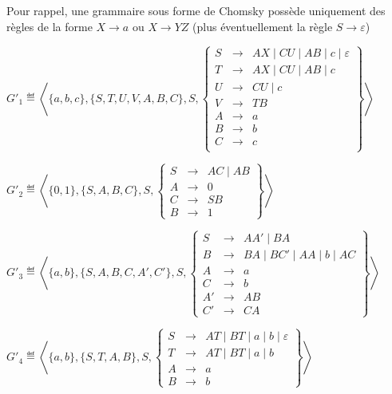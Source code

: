 \begin{corrections}
  
  Pour rappel, une grammaire sous forme de Chomsky possède uniquement des règles de la
  forme $X\rightarrow a$ ou $X\rightarrow YZ$
  (plus éventuellement la règle $S\rightarrow\varepsilon$)
  \begin{questions}
  \item $G'_1 \eqdef \left\langle\{a, b, c\}, \{S,T, U, V, A,B,C\}, S,
    \left\{\begin{array}{lll}
    S   &\rightarrow& AX \mid CU \mid  AB \mid c \mid \varepsilon \\
    T   &\rightarrow& AX \mid CU \mid  AB \mid c \\
    U   &\rightarrow& CU \mid  c \\
    V   &\rightarrow& TB \\
    A   &\rightarrow& a \\
    B   &\rightarrow& b \\
    C   &\rightarrow& c \\
    \end{array}\right\}\right\rangle$
  \item $G'_2 \eqdef \left\langle\{0, 1\}, \{S,A,B,C\}, S,
    \left\{\begin{array}{lll}
    S   &\rightarrow& AC \mid  AB \\
    A   &\rightarrow& 0 \\
    C   &\rightarrow& SB \\
    B   &\rightarrow& 1
    \end{array}\right\}\right\rangle$
  \item $G'_3 \eqdef \left\langle\{a, b\}, \{S, A, B, C, A', C'\}, S,
    \left\{\begin{array}{lll}
    S   &\rightarrow& AA' \mid  BA \\
    B   &\rightarrow& BA \mid  BC' \mid  AA \mid  b \mid  AC\\
    A   &\rightarrow& a \\
    C   &\rightarrow& b \\
    A' &\rightarrow& AB \\
    C' &\rightarrow& CA
    \end{array}\right\}\right\rangle$
  \item $G'_4 \eqdef \left\langle \{a,b\}, \{S, T, A, B\}, S,
    \left\{\begin{array}{lll}
    S   &\rightarrow& AT \mid BT \mid a \mid b \mid \varepsilon \\
    T   &\rightarrow& AT \mid BT \mid a \mid b \\
    A   &\rightarrow& a\\
    B   &\rightarrow& b
    \end{array}\right\} \right\rangle$
  \end{questions}

\end{corrections}

\endgroup
\endinput
